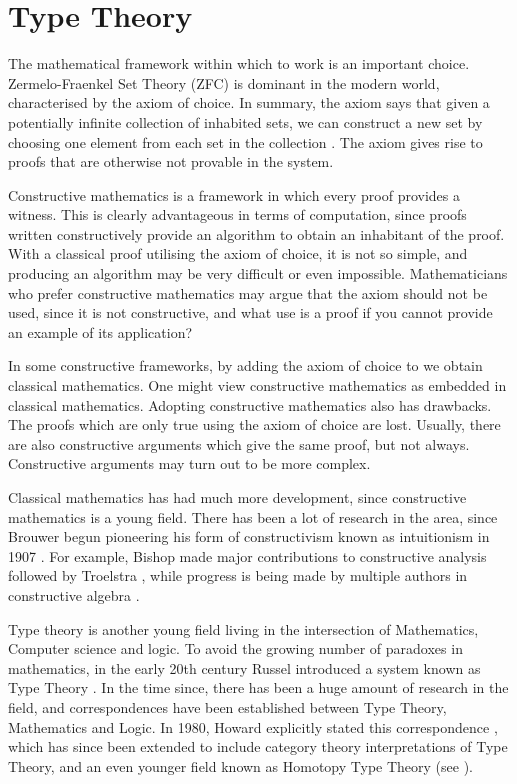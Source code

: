 \documentclass[ProjectReport]{subfiles}
\begin{document}
\section{Type Theory}
The mathematical framework within which to work is an important choice. Zermelo-Fraenkel Set Theory (ZFC) is dominant in the modern world, characterised by the axiom of choice. In summary, the axiom says that given a potentially infinite collection of inhabited sets, we can construct a new set by choosing one element from each set in the collection \cite{choiceaxiom}. The axiom gives rise to proofs that are otherwise not provable in the system. 

Constructive mathematics is a framework in which every proof provides a witness. This is clearly advantageous in terms of computation, since proofs written constructively provide an algorithm to obtain an inhabitant of the proof. With a classical proof utilising the axiom of choice, it is not so simple, and producing an algorithm may be very difficult or even impossible. Mathematicians who prefer constructive mathematics may argue that the axiom should not be used, since it is not constructive, and what use is a proof if you cannot provide an example of its application? 

In some constructive frameworks, by adding the axiom of choice to we obtain classical mathematics. One might view constructive mathematics as embedded in classical mathematics. Adopting constructive mathematics also has drawbacks. The proofs which are only true using the axiom of choice are lost. Usually, there are also constructive arguments which give the same proof, but not always. Constructive arguments may turn out to be more complex. 

Classical mathematics has had much more development, since constructive mathematics is a young field. There has been a lot of research in the area, since Brouwer begun pioneering his form of constructivism known as intuitionism in 1907 \cite{Brouwer}. For example, Bishop made major contributions to constructive analysis \cite{Bishop1987-BISCA-2} followed by Troelstra \cite{Troelstra1973-TROMIO}, while progress is being made by multiple authors in constructive algebra \cite{2015}.

Type theory is another young field living in the intersection of Mathematics, Computer science and logic. To avoid the growing number of paradoxes in mathematics, in the early 20th century Russel introduced a system known as Type Theory \cite{coquand_type_2018}. In the time since, there has been a huge amount of research in the field, and correspondences have been established between Type Theory, Mathematics and Logic. In 1980, Howard explicitly stated this correspondence \cite{Howard1980-HOWTFN-2}, which has since been extended to include category theory interpretations of Type Theory, and an even younger field known as Homotopy Type Theory (see \cite{hottbook}). 
\end{document}
